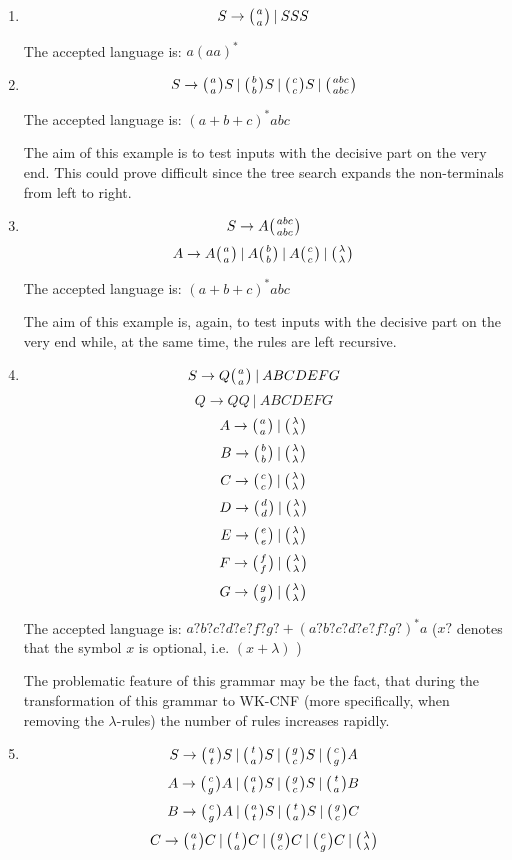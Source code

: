 \begin{enumerate}
  \item{
    $$S \rightarrow \wkpair{a}{a} \:|\: S S S$$

    The accepted language is: $a(aa)^*$
  }

  \item{
    $$S \rightarrow \wkpair{a}{a} S \:|\: \wkpair{b}{b} S \:|\: \wkpair{c}{c} S \:|\: \wkpair{abc}{abc}$$

    The accepted language is: $(a+b+c)^*abc$

    The aim of this example is to test inputs with the decisive part on the very end. This could prove difficult  since the tree search expands the non-terminals from left to right.
  }

  \item{
    $$S \rightarrow A \wkpair{abc}{abc}$$
    $$A \rightarrow A \wkpair{a}{a} \:|\: A \wkpair{b}{b} \:|\: A \wkpair{c}{c} \:|\: \wkpair{\lambda}{\lambda}$$

    The accepted language is: $(a+b+c)^*abc$

    The aim of this example is, again, to test inputs with the decisive part on the very end while, at the same time, the rules are left recursive.
  }

  \item{
    $$S \rightarrow Q \wkpair{a}{a} \:|\: A B C D E F G$$
    $$Q \rightarrow Q Q \:|\: A B C D E F G$$
    $$A \rightarrow \wkpair{a}{a} \:|\: \wkpair{\lambda}{\lambda}$$
    $$B \rightarrow \wkpair{b}{b} \:|\: \wkpair{\lambda}{\lambda}$$
    $$C \rightarrow \wkpair{c}{c} \:|\: \wkpair{\lambda}{\lambda}$$
    $$D \rightarrow \wkpair{d}{d} \:|\: \wkpair{\lambda}{\lambda}$$
    $$E \rightarrow \wkpair{e}{e} \:|\: \wkpair{\lambda}{\lambda}$$
    $$F \rightarrow \wkpair{f}{f} \:|\: \wkpair{\lambda}{\lambda}$$
    $$G \rightarrow \wkpair{g}{g} \:|\: \wkpair{\lambda}{\lambda}$$

    The accepted language is: $a?b?c?d?e?f?g? + (a?b?c?d?e?f?g?)^*a$ ($x?$ denotes that the symbol $x$ is optional, i.e. $(x + \lambda)$ )

    The problematic feature of this grammar may be the fact, that during the transformation of this grammar to WK-CNF (more specifically, when removing the $\lambda$-rules) the number of rules increases rapidly.
  }

  \item{
    $$S \rightarrow \wkpair{a}{t} S \:|\: \wkpair{t}{a} S \:|\: \wkpair{g}{c} S \:|\: \wkpair{c}{g} A$$
    $$A \rightarrow \wkpair{c}{g} A \:|\: \wkpair{a}{t} S \:|\: \wkpair{g}{c} S \:|\: \wkpair{t}{a} B$$
    $$B \rightarrow \wkpair{c}{g} A \:|\: \wkpair{a}{t} S \:|\: \wkpair{t}{a} S \:|\: \wkpair{g}{c} C$$
    $$C \rightarrow \wkpair{a}{t} C \:|\: \wkpair{t}{a} C \:|\: \wkpair{g}{c} C \:|\: \wkpair{c}{g} C \:|\: \wkpair{\lambda}{\lambda}$$

}
\end{enumerate}
